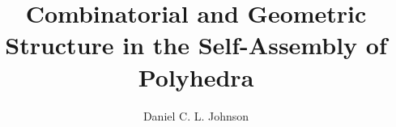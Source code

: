 \documentclass[12pt]{report}   %
\title{Combinatorial and Geometric Structure in the Self-Assembly of Polyhedra
}
\author{Daniel C. L. Johnson}
\begin{document}
\doublespacing
\begin{preliminaries}
\maketitle

\copyrightpage

\begin{signature}
\end{signature}

\begin{vita}
  
\end{vita}

\begin{acknowledgments}
  
\end{acknowledgments}

\begin{abstract}
  
  \thispagestyle{empty}
\end{abstract}

\begin{spacing}{1}
  \tableofcontents
  \clearpage{\pagestyle{empty}\cleardoublepage}

  \footnotesize
  \fontsize{11.5pt}{12.5pt}\selectfont
  \listoftables
  \clearpage{\pagestyle{empty}\cleardoublepage}

  \listoffigures
  \clearpage{\pagestyle{empty}\cleardoublepage}
  \normalsize
\end{spacing}

\end{preliminaries}

\pagestyle{myheadings}

\newtheorem{mythm}{Theorem}
\newtheorem{mylem}{Lemma}
\newtheorem{mycor}{Corollary}
\newtheorem{mydef}{Definition}
\newtheorem{mycon}{Conjecture}

\newcommand{\colorA}{white}
\newcommand{\colorB}{black}
\newcommand{\colorAsm}{w}
\newcommand{\colorBsm}{b}
\newcommand{\poly}{$\mathscr{P}$}
\newcommand{\Poly}{\mathscr{P}}
\newcommand{\PolyGraph}{\textswab{G}}
\newcommand{\faceset}{F\left(\mathscr{P}\right)}
\newcommand{\spc}{ }
\newcommand{\xj}{$x^j$}
\newcommand{\xk}{$x^k$}
\newcommand{\Sjk}{$S_{jk}$}
\newcommand{\Skj}{$S_{kj}$}
\newcommand{\G}{{G}}
\end{document}
